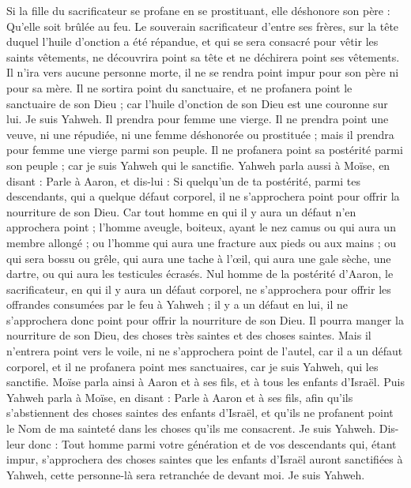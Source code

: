 \begin{multicols}{2}
Si la fille du sacrificateur se profane en se prostituant, elle déshonore son père : Qu'elle soit brûlée au feu.
Le souverain sacrificateur d'entre ses frères, sur la tête duquel l'huile d'onction a été répandue, et qui se sera consacré pour vêtir les saints vêtements, ne découvrira point sa tête et ne déchirera point ses vêtements.
Il n'ira vers aucune personne morte, il ne se rendra point impur pour son père ni pour sa mère.
Il ne sortira point du sanctuaire, et ne profanera point le sanctuaire de son Dieu ; car l'huile d'onction de son Dieu est une couronne sur lui. Je suis Yahweh.
Il prendra pour femme une vierge.
Il ne prendra point une veuve, ni une répudiée, ni une femme déshonorée ou prostituée ; mais il prendra pour femme une vierge parmi son peuple.
Il ne profanera point sa postérité parmi son peuple ; car je suis Yahweh qui le sanctifie.
Yahweh parla aussi à Moïse, en disant :
Parle à Aaron, et dis-lui : Si quelqu'un de ta postérité, parmi tes descendants, qui a quelque défaut corporel, il ne s'approchera point pour offrir la nourriture de son Dieu.
Car tout homme en qui il y aura un défaut n'en approchera point ; l'homme aveugle, boiteux, ayant le nez camus ou qui aura un membre allongé ;
ou l'homme qui aura une fracture aux pieds ou aux mains ;
ou qui sera bossu ou grêle, qui aura une tache à l'œil, qui aura une gale sèche, une dartre, ou qui aura les testicules écrasés.
Nul homme de la postérité d'Aaron, le sacrificateur, en qui il y aura un défaut corporel, ne s'approchera pour offrir les offrandes consumées par le feu à Yahweh ; il y a un défaut en lui, il ne s'approchera donc point pour offrir la nourriture de son Dieu.
Il pourra manger la nourriture de son Dieu, des choses très saintes et des choses saintes.
Mais il n'entrera point vers le voile, ni ne s'approchera point de l'autel, car il a un défaut corporel, et il ne profanera point mes sanctuaires, car je suis Yahweh, qui les sanctifie.
Moïse parla ainsi à Aaron et à ses fils, et à tous les enfants d'Israël.
\VerseOne{}Puis Yahweh parla à Moïse, en disant :
Parle à Aaron et à ses fils, afin qu'ils s'abstiennent des choses saintes des enfants d'Israël, et qu'ils ne profanent point le Nom de ma sainteté dans les choses qu'ils me consacrent. Je suis Yahweh.
Dis-leur donc : Tout homme parmi votre génération et de vos descendants qui, étant impur, s'approchera des choses saintes que les enfants d'Israël auront sanctifiées à Yahweh, cette personne-là sera retranchée de devant moi. Je suis Yahweh.

\end{multicols}
